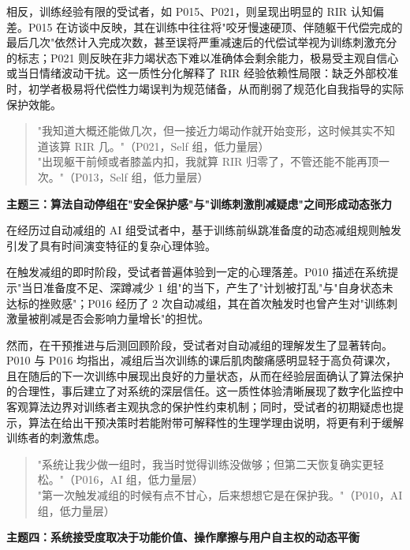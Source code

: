\documentclass[UTF8,zihao=-4,twoside,openany]{ctexbook}
\begin{document}
相反，训练经验有限的受试者，如 P015、P021，则呈现出明显的 RIR 认知偏差。P015 在访谈中反映，其在训练中往往将"咬牙慢速硬顶、伴随躯干代偿完成的最后几次"依然计入完成次数，甚至误将严重减速后的代偿试举视为训练刺激充分的标志；P021 则反映在非力竭状态下难以准确体会剩余能力，极易受主观自信心或当日情绪波动干扰。这一质性分化解释了 RIR 经验依赖性局限：缺乏外部校准时，初学者极易将代偿性力竭误判为规范储备，从而削弱了规范化自我指导的实际保护效能。

\begin{quote}
  \kaishu\fontsize{10.5pt}{16pt}\selectfont
  "我知道大概还能做几次，但一接近力竭动作就开始变形，这时候其实不知道该算 RIR 几。"（P021，Self 组，低力量层） \\[0.2cm]
  "出现躯干前倾或者膝盖内扣，我就算 RIR 归零了，不管还能不能再顶一次。"（P013，Self 组，低力量层）
\end{quote}

\vspace{0.3cm}
\noindent \textbf{主题三：算法自动停组在"安全保护感"与"训练刺激削减疑虑"之间形成动态张力}

在经历过自动减组的 AI 组受试者中，基于训练前纵跳准备度的动态减组规则触发引发了具有时间演变特征的复杂心理体验。

在触发减组的即时阶段，受试者普遍体验到一定的心理落差。P010 描述在系统提示"当日准备度不足、深蹲减少 1 组"的当下，产生了"计划被打乱"与"自身状态未达标的挫败感"；P016 经历了 2 次自动减组，其在首次触发时也曾产生对"训练刺激量被削减是否会影响力量增长"的担忧。

然而，在干预推进与后测回顾阶段，受试者对自动减组的理解发生了显著转向。P010 与 P016 均指出，减组后当次训练的课后肌肉酸痛感明显轻于高负荷课次，且在随后的下一次训练中展现出良好的力量状态，从而在经验层面确认了算法保护的合理性，事后建立了对系统的深层信任。这一质性体验清晰展现了数字化监控中客观算法边界对训练者主观执念的保护性约束机制；同时，受试者的初期疑虑也提示，算法在给出干预决策时若能附带可解释性的生理学理由说明，将更有利于缓解训练者的刺激焦虑。

\begin{quote}
  \kaishu\fontsize{10.5pt}{16pt}\selectfont
  "系统让我少做一组时，我当时觉得训练没做够；但第二天恢复确实更轻松。"（P016，AI 组，低力量层） \\[0.2cm]
  "第一次触发减组的时候有点不甘心，后来想想它是在保护我。"（P010，AI 组，低力量层）
\end{quote}

\vspace{0.3cm}
\noindent \textbf{主题四：系统接受度取决于功能价值、操作摩擦与用户自主权的动态平衡}
\end{document}

